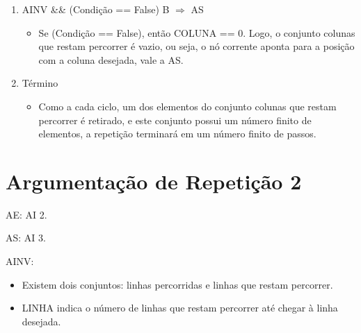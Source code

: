 \documentclass[a4paper,12pt,oneside]{book}
\begin{document}
\begin{enumerate}[label=\protect\circled{\arabic*}]
    \item AINV \&\& (Condição == False) \circled{+} B $\Longrightarrow$ AS

          \begin{itemize}
              \item Se (Condição == False), então COLUNA == 0. Logo, o conjunto colunas que restam percorrer é vazio, ou seja, o nó corrente aponta para a posição com a coluna desejada, vale a AS.
          \end{itemize}

    \item Término

          \begin{itemize}
              \item Como a cada ciclo, um dos elementos do conjunto colunas que restam percorrer é retirado, e este conjunto possui um número finito de elementos, a repetição terminará em um número finito de passos.
          \end{itemize}

\end{enumerate}

\chapter{Argumentação de Repetição 2}

AE: AI 2.

AS: AI 3.

AINV:

\begin{itemize}

    \item Existem dois conjuntos: linhas percorridas e linhas que restam percorrer.
    \item LINHA indica o número de linhas que restam percorrer até chegar à linha desejada.

\end{itemize}
\end{document}
